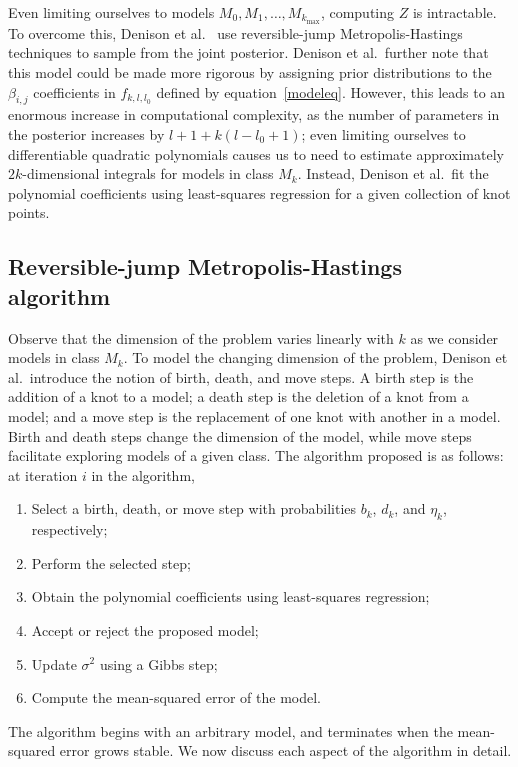 \documentclass[12pt]{article}
\begin{document}
Even limiting ourselves to models $M_0, M_1, \ldots,
M_{k_{\text{max}}}$, computing $Z$ is intractable. To overcome this,
Denison et al.\ \cite{denison1998automatic} use reversible-jump
Metropolis-Hastings techniques to sample from the joint posterior.
Denison et al.\ further note that this model could be made more
rigorous by assigning prior distributions to the $\beta_{i, j}$
coefficients in $f_{k, l, l_0}$ defined by
equation~\ref{modeleq}. However, this leads to an enormous increase in
computational complexity, as the number of parameters in the posterior
increases by $l + 1 + k (l - l_0 + 1)$; even limiting ourselves to
differentiable quadratic polynomials causes us to need to estimate
approximately $2 k$-dimensional integrals for models in class
$M_k$. Instead, Denison et al.\ fit the polynomial coefficients using
least-squares regression for a given collection of knot points.

\subsection{Reversible-jump Metropolis-Hastings algorithm}

Observe that the dimension of the problem varies linearly with $k$ as
we consider models in class $M_k$. To model the changing dimension of
the problem, Denison et al.\ introduce the notion of birth, death, and
move steps. A birth step is the addition of a knot to a model; a death
step is the deletion of a knot from a model; and a move step is the
replacement of one knot with another in a model. Birth and death steps
change the dimension of the model, while move steps facilitate
exploring models of a given class. The algorithm proposed is as
follows: at iteration $i$ in the algorithm,
\begin{enumerate}
\item 
  Select a birth, death, or move step with probabilities $b_k$, $d_k$,
  and $\eta_k$, respectively;

\item
  Perform the selected step;

\item
  Obtain the polynomial coefficients using least-squares regression;

\item
  Accept or reject the proposed model;

\item
  Update $\sigma^2$ using a Gibbs step;

\item
  Compute the mean-squared error of the model.
\end{enumerate}
The algorithm begins with an arbitrary model, and terminates when the
mean-squared error grows stable. We now discuss each aspect of
the algorithm in detail.
\end{document}
